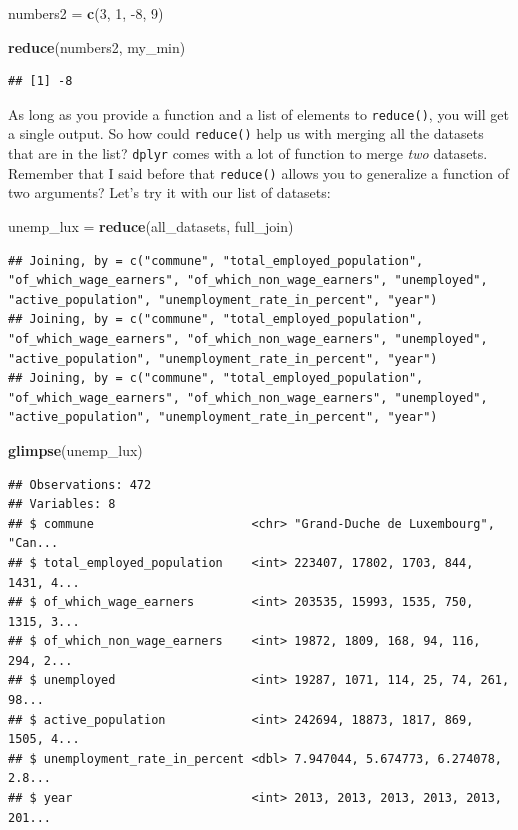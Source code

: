\documentclass[]{gitbook}
\newenvironment{Shaded}{\begin{snugshade}}{\end{snugshade}}
\newcommand{\DecValTok}[1]{\textcolor[rgb]{0.00,0.00,0.81}{#1}}
\newcommand{\KeywordTok}[1]{\textcolor[rgb]{0.13,0.29,0.53}{\textbf{#1}}}
\newcommand{\NormalTok}[1]{#1}
\newcommand{\StringTok}[1]{\textcolor[rgb]{0.31,0.60,0.02}{#1}}
\theoremstyle{definition}
\theoremstyle{definition}
\theoremstyle{definition}
\theoremstyle{remark}
\begin{document}
\begin{Shaded}
\begin{Highlighting}[]
\NormalTok{numbers2 =}\StringTok{ }\KeywordTok{c}\NormalTok{(}\DecValTok{3}\NormalTok{, }\DecValTok{1}\NormalTok{, }\DecValTok{-8}\NormalTok{, }\DecValTok{9}\NormalTok{)}

\KeywordTok{reduce}\NormalTok{(numbers2, my_min)}
\end{Highlighting}
\end{Shaded}

\begin{verbatim}
## [1] -8
\end{verbatim}

As long as you provide a function and a list of elements to
\texttt{reduce()}, you will get a single output. So how could
\texttt{reduce()} help us with merging all the datasets that are in the
list? \texttt{dplyr} comes with a lot of function to merge \emph{two}
datasets. Remember that I said before that \texttt{reduce()} allows you
to generalize a function of two arguments? Let's try it with our list of
datasets:

\begin{Shaded}
\begin{Highlighting}[]
\NormalTok{unemp_lux =}\StringTok{ }\KeywordTok{reduce}\NormalTok{(all_datasets, full_join)}
\end{Highlighting}
\end{Shaded}

\begin{verbatim}
## Joining, by = c("commune", "total_employed_population", "of_which_wage_earners", "of_which_non_wage_earners", "unemployed", "active_population", "unemployment_rate_in_percent", "year")
## Joining, by = c("commune", "total_employed_population", "of_which_wage_earners", "of_which_non_wage_earners", "unemployed", "active_population", "unemployment_rate_in_percent", "year")
## Joining, by = c("commune", "total_employed_population", "of_which_wage_earners", "of_which_non_wage_earners", "unemployed", "active_population", "unemployment_rate_in_percent", "year")
\end{verbatim}

\begin{Shaded}
\begin{Highlighting}[]
\KeywordTok{glimpse}\NormalTok{(unemp_lux)}
\end{Highlighting}
\end{Shaded}

\begin{verbatim}
## Observations: 472
## Variables: 8
## $ commune                      <chr> "Grand-Duche de Luxembourg", "Can...
## $ total_employed_population    <int> 223407, 17802, 1703, 844, 1431, 4...
## $ of_which_wage_earners        <int> 203535, 15993, 1535, 750, 1315, 3...
## $ of_which_non_wage_earners    <int> 19872, 1809, 168, 94, 116, 294, 2...
## $ unemployed                   <int> 19287, 1071, 114, 25, 74, 261, 98...
## $ active_population            <int> 242694, 18873, 1817, 869, 1505, 4...
## $ unemployment_rate_in_percent <dbl> 7.947044, 5.674773, 6.274078, 2.8...
## $ year                         <int> 2013, 2013, 2013, 2013, 2013, 201...
\end{verbatim}
\end{document}
